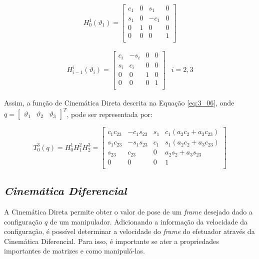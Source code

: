 \begin{equation}
H_0^1 (\vartheta_1) = 
\begin{bmatrix}
c_1 & 0 & s_1 & 0 \\
s_1 & 0 & -c_1 & 0 \\
0 & 1 & 0 & 0 \\
0 & 0 & 0 & 1 \\
\end{bmatrix} 
\label{eq:3_07}
\end{equation}

\begin{equation}
\begin{matrix}
H_{i-1}^i (\vartheta_i) = 
\begin{bmatrix}
c_i & -s_i & 0 & 0 \\
s_i & c_i & 0 & 0 \\
0 & 0 & 1 & 0 \\
0 & 0 & 0 & 1 \\
\end{bmatrix} & i = 2,3
\end{matrix}
\label{eq:3_08}
\end{equation}

Assim, a função de Cinemática Direta descrita na Equação \ref{eq:3_06}, onde $q = \begin{bmatrix}\vartheta_1 & \vartheta_2 & \vartheta_3\end{bmatrix}^T$, pode ser representada por:

\begin{equation}
T_0^3 (q) = 
H_0^1 H_1^2 H_2^3 = 
\begin{bmatrix}
c_1 c_{23} & -c_1 s_{23} & s_1 & c_1(a_2 c_2 + a_3 c_{23}) \\
s_1 c_{23} & -s_1 s_{23} & c_1 & s_1(a_2 c_2 + a_3 c_{23}) \\
s_{23} & c_{23} & 0 & a_2 s_2 + a_3 s_{23} \\
0 & 0 & 0 & 1 \\
\end{bmatrix} 
\label{eq:3_09}
\end{equation}

\subsection{\textit{Cinemática Diferencial}}\label{sec:Cap3_CinDif}

A Cinemática Direta permite obter o valor de pose de um \textit{frame} desejado dado a configuração $q$ de um manipulador. Adicionando a informação da velocidade da configuração, é possível determinar a velocidade do \textit{frame} do efetuador através da Cinemática Diferencial. Para isso, é importante se ater a propriedades importantes de matrizes e como manipulá-las.

